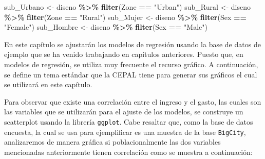 \documentclass[
  12pt,
]{book}
\newenvironment{Shaded}{\begin{snugshade}}{\end{snugshade}}
\newcommand{\FunctionTok}[1]{\textcolor[rgb]{0.13,0.29,0.53}{\textbf{#1}}}
\newcommand{\NormalTok}[1]{#1}
\newcommand{\OtherTok}[1]{\textcolor[rgb]{0.56,0.35,0.01}{#1}}
\newcommand{\SpecialCharTok}[1]{\textcolor[rgb]{0.81,0.36,0.00}{\textbf{#1}}}
\newcommand{\StringTok}[1]{\textcolor[rgb]{0.31,0.60,0.02}{#1}}
\begin{document}
\begin{Shaded}
\begin{Highlighting}[]
\NormalTok{sub\_Urbano }\OtherTok{\textless{}{-}}\NormalTok{ diseno }\SpecialCharTok{\%\textgreater{}\%}  \FunctionTok{filter}\NormalTok{(Zone }\SpecialCharTok{==} \StringTok{"Urban"}\NormalTok{)}
\NormalTok{sub\_Rural  }\OtherTok{\textless{}{-}}\NormalTok{ diseno }\SpecialCharTok{\%\textgreater{}\%}  \FunctionTok{filter}\NormalTok{(Zone }\SpecialCharTok{==} \StringTok{"Rural"}\NormalTok{)}
\NormalTok{sub\_Mujer  }\OtherTok{\textless{}{-}}\NormalTok{ diseno }\SpecialCharTok{\%\textgreater{}\%}  \FunctionTok{filter}\NormalTok{(Sex }\SpecialCharTok{==} \StringTok{"Female"}\NormalTok{)}
\NormalTok{sub\_Hombre }\OtherTok{\textless{}{-}}\NormalTok{ diseno }\SpecialCharTok{\%\textgreater{}\%}  \FunctionTok{filter}\NormalTok{(Sex }\SpecialCharTok{==} \StringTok{"Male"}\NormalTok{)}
\end{Highlighting}
\end{Shaded}

En este capítulo se ajustarán los modelos de regresión usando la base de datos de ejemplo que se ha venido trabajando en capítulos anteriores. Puesto que, en modelos de regresión, se utiliza muy frecuente el recurso gráfico. A continuación, se define un tema estándar que la CEPAL tiene para generar sus gráficos el cual se utilizará en este capítulo.

Para observar que existe una correlación entre el ingreso y el gasto, las cuales son las variables que se utilizarán para el ajuste de los modelos, se construye un scatterplot usando la librería \texttt{ggplot}. Cabe resaltar que, como la base de datos encuesta, la cual se usa para ejemplificar es una muestra de la base \texttt{BigCity}, analizaremos de manera gráfica si poblacionalmente las dos variables mencionadas anteriormente tienen correlación como se muestra a continuación:
\end{document}
